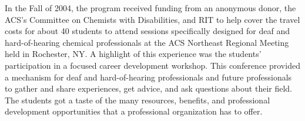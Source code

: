 \documentclass[11.5pt]{sig-alternate} %
\begin{document}
\begin{large}
\begin{enumerate}[label=\Alph*)]
\begin{enumerate}
        \begin{sloppypar}In the Fall of 2004, the program received funding from an anonymous donor, the ACS’s Committee on Chemists with Disabilities, and RIT to help cover the travel costs for about 40 students to attend sessions specifically designed for deaf and hard-of-hearing chemical professionals at the ACS Northeast Regional Meeting held in Rochester, NY. A highlight of this experience was the students’ participation in a focused career development workshop. This conference provided a mechanism for deaf and hard-of-hearing professionals and future professionals to gather and share experiences, get advice, and ask questions about their field. The students got a taste of the many resources, benefits, and professional development opportunities that a professional organization has to offer.
        

\end{sloppypar}
\end{enumerate}
\end{enumerate}
\end{large}
\end{document}
